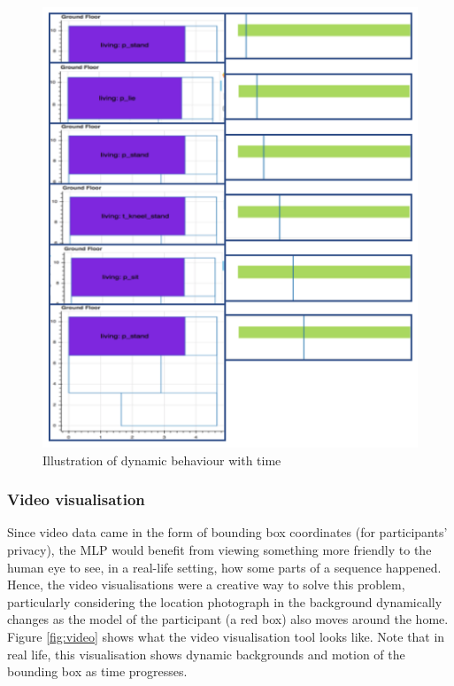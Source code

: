 \documentclass[fleqn,10pt]{SelfArx} %
\begin{document}
\begin{figure}[!h] \centering
	\includegraphics[scale=0.5]{slider} 
	\caption{Illustration of dynamic behaviour with time}
	\label{fig:slider}
\end{figure}

\subsubsection{Video visualisation}
Since video data came in the form of bounding box coordinates (for participants’ privacy), the MLP would benefit from viewing something more friendly to the human eye to see, in a real-life setting, how some parts of a sequence happened. Hence, the video visualisations were a creative way to solve this problem, particularly considering the location photograph in the background dynamically changes as the model of the participant (a red box) also moves around the home. Figure \ref{fig:video} shows what the video visualisation tool looks like. Note that in real life, this visualisation shows dynamic backgrounds and motion of the bounding box as time progresses. \\
\end{document}
